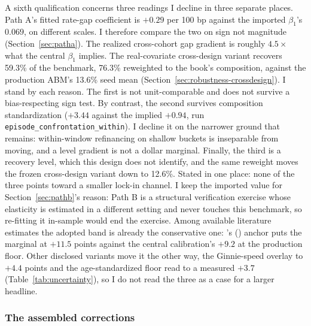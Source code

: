 \documentclass[12pt]{article}
\newcommand{\citepos}[1]{\citeauthor{#1}'s (\citeyear{#1})}
\begin{document}
A sixth qualification concerns three readings I decline in three separate places. Path A's fitted rate-gap coefficient is $+0.29$ per 100 bp against the imported $\beta_1$'s $0.069$, on different scales. I therefore compare the two on sign not magnitude (Section~\ref{sec:patha}). The realized cross-cohort gap gradient is roughly $4.5\times$ what the central $\beta_1$ implies. The real-covariate cross-design variant recovers 59.3\% of the benchmark, 76.3\% reweighted to the book's composition, against the production ABM's 13.6\% seed mean (Section~\ref{sec:robustness-crossdesign}). I stand by each reason. The first is not unit-comparable and does not survive a bias-respecting sign test. By contrast, the second survives composition standardization ($+3.44$ against the implied $+0.94$, run \texttt{episode\_confrontation\_within}). I decline it on the narrower ground that remains: within-window refinancing on shallow buckets is inseparable from moving, and a level gradient is not a dollar marginal. Finally, the third is a recovery level, which this design does not identify, and the same reweight moves the frozen cross-design variant down to 12.6\%. Stated in one place: none of the three points toward a smaller lock-in channel. I keep the imported value for Section~\ref{sec:pathb}'s reason: Path B is a structural verification exercise whose elasticity is estimated in a different setting and never touches this benchmark, so re-fitting it in-sample would end the exercise. Among available literature estimates the adopted band is already the conservative one: \citepos{fonseca2024} anchor puts the marginal at $+11.5$ points against the central calibration's $+9.2$ at the production floor. Other disclosed variants move it the other way, the Ginnie-speed overlay to $+4.4$ points and the age-standardized floor read to a measured $+3.7$ (Table~\ref{tab:uncertainty}), so I do not read the three as a case for a larger headline.

\subsubsection{The assembled corrections}
\end{document}
